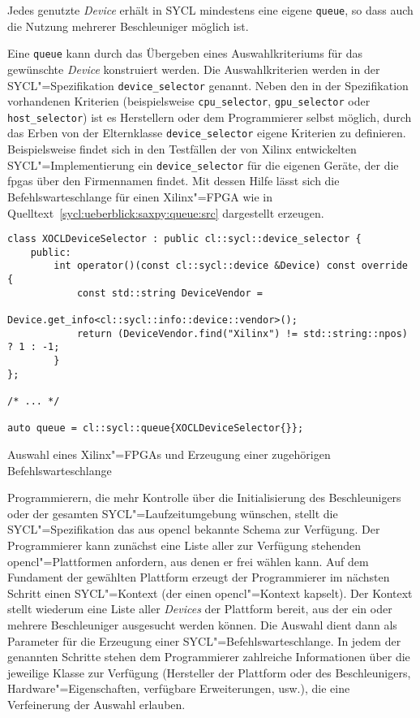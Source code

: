 Jedes genutzte \textit{Device} erhält in SYCL mindestens eine eigene
\texttt{queue}, so dass auch die Nutzung mehrerer Beschleuniger möglich ist.

Eine \texttt{queue} kann durch das Übergeben eines Auswahlkriteriums für das
gewünschte \textit{Device} konstruiert werden. Die Auswahlkriterien werden in
der SYCL"=Spezifikation \texttt{device\_selector} genannt. Neben den in der
Spezifikation vorhandenen Kriterien (beispielsweise \texttt{cpu\_selector},
\texttt{gpu\_selector} oder \texttt{host\_selector}) ist es Herstellern oder dem
Programmierer selbst möglich, durch das Erben von der Elternklasse
\texttt{device\_selector} eigene Kriterien zu definieren. Beispielsweise findet
sich in den Testfällen der von Xilinx entwickelten SYCL"=Implementierung ein
\texttt{device\_selector} für die eigenen Geräte, der die \gls{fpga}s über den
Firmennamen findet. Mit dessen Hilfe lässt sich die Befehlswarteschlange für
einen Xilinx"=FPGA wie in Quelltext~\ref{sycl:ueberblick:saxpy:queue:src}
dargestellt erzeugen.
%
\begin{code}
    \begin{verbatim}
class XOCLDeviceSelector : public cl::sycl::device_selector {
    public:
        int operator()(const cl::sycl::device &Device) const override {
            const std::string DeviceVendor =
                            Device.get_info<cl::sycl::info::device::vendor>();
            return (DeviceVendor.find("Xilinx") != std::string::npos) ? 1 : -1;
        }
};

/* ... */

auto queue = cl::sycl::queue{XOCLDeviceSelector{}};
    \end{verbatim}
    \caption{Auswahl eines Xilinx"=FPGAs und Erzeugung einer zugehörigen
             Befehlswarteschlange}
    \label{sycl:ueberblick:saxpy:queue:src}
\end{code}
%
\noindent
Programmierern, die mehr Kontrolle über die Initialisierung des Beschleunigers
oder der gesamten SYCL"=Laufzeitumgebung wünschen, stellt die
SYCL"=Spezifikation das aus \gls{opencl} bekannte Schema zur Verfügung. Der
Programmierer kann zunächst eine Liste aller zur Verfügung stehenden
\gls{opencl}"=Plattformen anfordern, aus denen er frei wählen kann. Auf dem
Fundament der gewählten Plattform erzeugt der Programmierer im nächsten Schritt
einen SYCL"=Kontext (der einen \gls{opencl}"=Kontext kapselt). Der Kontext
stellt wiederum eine Liste aller \textit{Devices} der Plattform bereit, aus der
ein oder mehrere Beschleuniger ausgesucht werden können. Die Auswahl dient dann
als Parameter für die Erzeugung einer SYCL"=Befehlswarteschlange. In jedem
der genannten Schritte stehen dem Programmierer zahlreiche Informationen über
die jeweilige Klasse zur Verfügung (Hersteller der Plattform oder des
Beschleunigers, Hardware"=Eigenschaften, verfügbare Erweiterungen, usw.), die
eine Verfeinerung der Auswahl erlauben.

